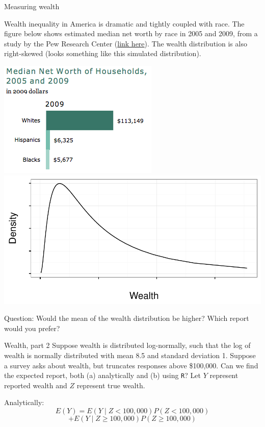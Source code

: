 \documentclass{beamer}
\begin{document}
\begin{frame}{Measuring wealth}
\begin{footnotesize}Wealth inequality in America is dramatic and tightly coupled with race. The figure below shows estimated median net worth by race in 2005 and 2009, from a study by the Pew Research Center (\href{<http://citeseerx.ist.psu.edu/viewdoc/download?doi=10.1.1.397.5775&rep=rep1&type=pdf>}{link here}). The wealth distribution is also right-skewed (looks something like this simulated distribution).\end{footnotesize}
\newline
\newline
\includegraphics[scale=.5]{figures/Pew_wealth.png}\includegraphics[scale=.3]{figures/WealthDist.pdf}

\alert{Question:} Would the mean of the wealth distribution be higher? Which report would you prefer?

\end{frame}

\begin{frame}{Wealth, part 2}
Suppose wealth is distributed log-normally, such that the log of wealth is normally distributed with mean 8.5 and standard deviation 1. Suppose a survey asks about wealth, but truncates responses above \$100,000. Can we find the expected report, both (a) analytically and (b) using \texttt{R}? Let $Y$ represent reported wealth and $Z$ represent true wealth.

Analytically: \pause
$$E(Y)=E(Y\mid Z<100,000)P(Z<100,000)$$
$$+E(Y\mid Z\geq 100,000)P(Z\geq 100,000)$$
\end{frame}
\end{document}
